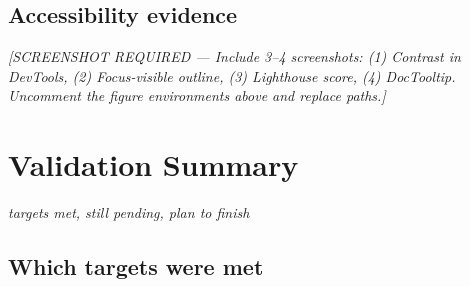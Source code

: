 \documentclass[10pt,a4paper]{article}
\begin{document}
\subsection{Accessibility evidence}





\emph{[SCREENSHOT REQUIRED --- Include 3--4 screenshots: (1) Contrast in DevTools, (2) Focus-visible outline, (3) Lighthouse score, (4) DocTooltip. Uncomment the figure environments above and replace paths.]}


\section{Validation Summary}
\hfill\emph{targets met, still pending, plan to finish}

\subsection{Which targets were met}
\end{document}
